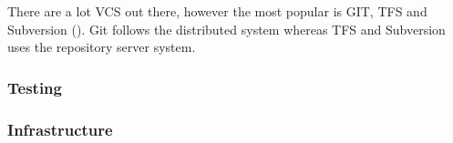 There are a lot VCS out there, however the most popular is GIT, TFS and Subversion (\cite{vcspop}). Git follows the distributed system whereas TFS and Subversion uses the repository server system.

\subsubsection{Testing}

\subsubsection{Infrastructure}